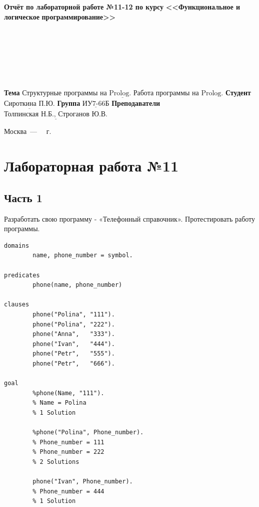 \documentclass[12pt]{report}
\begin{document}
\begin{titlepage}
	
	\begin{center}
		\noindent\begin{minipage}{1.3\textwidth}\centering
			\Large\textbf{  Отчёт по лабораторной работе №11-12 по курсу}\newline\newline
			\textbf{<<Функциональное и логическое}\newline
			\textbf{\indent\indent\indent программирование>>}\newline
		\end{minipage}
	\end{center}
	
	~\\\\\\\\\\\\
	\large
	\noindent\textbf{Тема } $\underline{\text{Структурные программы на Prolog. Работа программы на Prolog.}}$\newline\newline
	\noindent\textbf{Студент } $\underline{\text{Сироткина П.Ю.}}$\newline\newline
	\noindent\textbf{Группа } $\underline{\text{ИУ7-66Б}}$\newline\newline
	\noindent\textbf{Преподаватели } $\underline{\text{Толпинская Н.Б., Строганов Ю.В.}}$\newline\newline\newline
	
	\begin{center}
		\vfill
		Москва~---~\the\year
		~г.
	\end{center}
\end{titlepage}

\chapter*{Лабораторная работа №11}
\section*{Часть 1}

Разработать свою программу - «Телефонный справочник». Протестировать работу программы.

\begin{lstlisting}
domains
		name, phone_number = symbol.

predicates
		phone(name, phone_number)  

clauses
		phone("Polina", "111").
		phone("Polina", "222").
		phone("Anna",   "333").
		phone("Ivan",   "444").
		phone("Petr",   "555").
		phone("Petr",   "666").

goal
		%phone(Name, "111").
		% Name = Polina
		% 1 Solution

		%phone("Polina", Phone_number).
		% Phone_number = 111
		% Phone_number = 222
		% 2 Solutions

		phone("Ivan", Phone_number).
		% Phone_number = 444
		% 1 Solution
\end{lstlisting}
\end{document}
